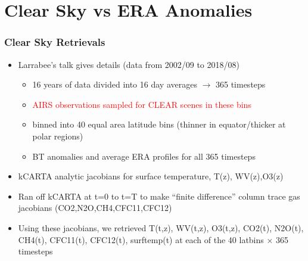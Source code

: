 \documentclass[10pt,t]{beamer}
\begin{document}
\section{Clear Sky vs ERA Anomalies}
\begin{frame}
  \frametitle{Clear Sky Retrievals}
  \begin{itemize}
    \item Larrabee's talk gives details (data from 2002/09 to 2018/08)
      \begin{itemize}
        \item 16 years of data divided into 16 day averages $\rightarrow$ 365 timesteps
        \item \textcolor{red}{AIRS observations sampled for CLEAR scenes in these bins}
        \item binned into 40 equal area latitude bins (thinner in equator/thicker at polar regions)
        \item BT anomalies and average ERA profiles for all 365 timesteps
      \end{itemize}
    \item kCARTA analytic jacobians for surface temperature, T(z), WV(z),O3(z)
    \item Ran off kCARTA at t=0 to t=T to make ``finite difference'' column trace gas jacobians
          (CO2,N2O,CH4,CFC11,CFC12)
    \item Using these jacobians, we retrieved T(t,z), WV(t,z), O3(t,z), CO2(t), N2O(t), CH4(t), 
          CFC11(t), CFC12(t), surftemp(t)
          at each of the 40 latbins $\times $ 365 timesteps
  \end{itemize}
\end{frame}

\end{document}
